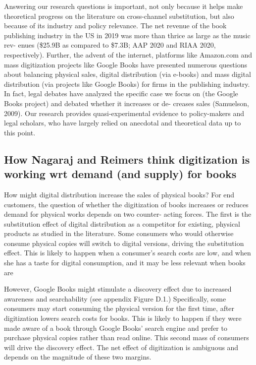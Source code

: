 \documentclass{article}
\begin{document}
Answering our research questions is important, not only because it helps make theoretical progress on the literature on cross-channel substitution, but also because of its industry and policy relevance. The net revenue of the book publishing industry in the US in 2019 was more than thrice as large as the music rev- enues (\$25.9B as compared to \$7.3B; AAP 2020 and RIAA 2020, respectively). Further, the advent of the internet, platforms like Amazon.com and mass digitization projects like Google Books have presented numerous questions about balancing physical sales, digital distribution (via e-books) and mass digital distribution (via projects like Google Books) for firms in the publishing industry. In fact, legal debates have analyzed the specific case we focus on (the Google Books project) and debated whether it increases or de- creases sales (Samuelson, 2009). Our research provides quasi-experimental evidence to policy-makers and legal scholars, who have largely relied on anecdotal and theoretical data up to this point.

\subsection{How Nagaraj and Reimers think digitization is working wrt demand (and supply) for books}
How might digital distribution increase the sales of physical books? For end customers, the question of
whether the digitization of books increases or reduces demand for physical works depends on two counter-
acting forces. The first is the substitution effect of digital distribution as a competitor for existing, physical
products as studied in the literature. Some consumers who would otherwise consume physical copies will
switch to digital versions, driving the substitution effect. This is likely to happen when a consumer’s search
costs are low, and when she has a taste for digital consumption, and it may be less relevant when books are 

However, Google Books might stimulate a discovery effect due to increased awareness and searchability (see appendix Figure D.1.) Specifically, some consumers may start consuming the physical version for the first time, after digitization lowers search costs for books. This is likely to happen if they were made aware of a book through Google Books’ search engine and prefer to purchase physical copies rather than read online. This second mass of consumers will drive the discovery effect. The net effect of digitization is ambiguous and depends on the magnitude of these two margins.
\end{document}
